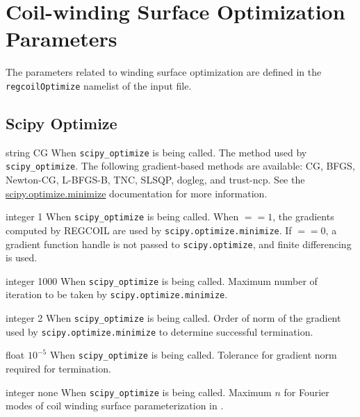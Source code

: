 \myhrule

\section{Coil-winding Surface Optimization Parameters}

\myhrule

The parameters related to winding surface optimization are defined in the \texttt{regcoilOptimize} namelist of the input file. 

\myhrule

\subsection{Scipy Optimize}

\myhrule

{string}
{CG}
{When \texttt{scipy\_optimize} is being called.}
{The method used by \texttt{scipy\_optimize}. The following gradient-based methods are available: CG, BFGS, Newton-CG, L-BFGS-B, TNC, SLSQP, dogleg, and trust-ncp. See the \\
\href{https://docs.scipy.org/doc/scipy/reference/generated/scipy.optimize.minimize.html}{scipy.optimize.minimize} documentation for more information.}

\myhrule

{integer}
{1}
{When \texttt{scipy\_optimize} is being called.}
{When  $ == 1$, the gradients computed by REGCOIL are used by \texttt{scipy.optimize.minimize}. If  $ == 0$, a gradient function handle is not passed to \texttt{scipy.optimize}, and finite differencing is used.}

\myhrule

{integer}
{1000}
{When \texttt{scipy\_optimize} is being called.}
{Maximum number of iteration to be taken by \texttt{scipy.optimize.minimize}.}

\myhrule

{integer}
{2}
{When \texttt{scipy\_optimize} is being called.}
{Order of norm of the gradient used by \texttt{scipy.optimize.minimize} to determine successful termination.}

\myhrule

{float}
{$10^{-5}$}
{When \texttt{scipy\_optimize} is being called.}
{Tolerance for gradient norm required for termination.}

\myhrule

{integer}
{none}
{When \texttt{scipy\_optimize} is being called.}
{Maximum $n$ for Fourier modes of coil winding surface parameterization in .}

